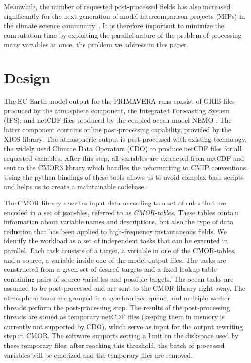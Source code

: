 \documentclass[procedia]{easychair}
\begin{document}
Meanwhile, the number of requested post-processed fields has also increased significantly for the next generation of model intercomparison projects (MIPs) in the climate 
science community~\cite{eyri:2016b}.
It is therefore important to minimize the 
computation time by 
exploiting the parallel nature of the problem of processing many variables at 
once, the problem we address in this paper.

\section{Design}
The EC-Earth model output for the PRIMAVERA runs consist of GRIB-files produced 
by the atmosphere component, the Integrated Forecasting System (IFS), and 
netCDF files produced by the coupled ocean model NEMO \cite{NEMO}. The latter 
component 
contains online post-processing capability, provided by the XIOS library. The 
atmospheric output is post-processed with existing technology, the widely used 
Climate Data Operators (CDO) \cite{CDO} to produce netCDF files for all 
requested 
variables. After this step, all variables are extracted from netCDF and sent to 
the CMOR3 library \cite{CMOR} which handles the reformatting to CMIP 
conventions. Using the 
python bindings of these tools allows us to avoid complex bash scripts and 
helps us to create a maintainable codebase.

The CMOR library rewrites input data according to a set of rules that are 
encoded in a set of json-files, referred to as \emph{CMOR-tables}. These tables 
contain information about variable names and descriptions, but also the type of 
data reduction that has been applied to high-frequency instantaneous fields. We 
identify the workload as a set of independent tasks that can be executed in 
parallel. Each task consists of a target, a variable in one of the CMOR-tables, 
and a source, a variable inside one of the model output files. The tasks are 
constructed from a given set of desired targets and a fixed lookup table 
containing pairs of source variables and possible targets. The ocean tasks 
are assumed to be post-processed and are sent to the CMOR library right away. 
The atmosphere tasks are grouped in a synchronized queue, and multiple worker 
threads perform the post-processing step. The results of the post-processing 
threads are stored as temporary netCDF files (keeping them in memory is 
currently not supported by CDO), which serve as input for the output rewriting 
step in CMOR. The software supports setting a limit on the diskspace used by 
these temporary files: after reaching this threshold, the batch of processed 
variables will be cmorized and the temporary files are removed.
\end{document}
